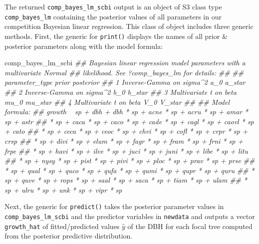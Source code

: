 \documentclass[12pt]{article}
\newenvironment{Shaded}{\begin{snugshade}}{\end{snugshade}}
\newcommand{\CommentTok}[1]{\textcolor[rgb]{0.56,0.35,0.01}{\textit{#1}}}
\newcommand{\DataTypeTok}[1]{\textcolor[rgb]{0.13,0.29,0.53}{#1}}
\newcommand{\KeywordTok}[1]{\textcolor[rgb]{0.13,0.29,0.53}{\textbf{#1}}}
\newcommand{\NormalTok}[1]{#1}
\newcommand{\OperatorTok}[1]{\textcolor[rgb]{0.81,0.36,0.00}{\textbf{#1}}}
\newcommand{\StringTok}[1]{\textcolor[rgb]{0.31,0.60,0.02}{#1}}
\begin{document}
The returned \texttt{comp\_bayes\_lm\_scbi} output is an object of S3
class type \texttt{comp\_bayes\_lm} containing the posterior values of
all parameters in our competition Bayesian linear regression. This class
of object includes three generic methods. First, the generic for
\texttt{print()} displays the names of all prior \& posterior parameters
along with the model formula:

\begin{Shaded}
\begin{Highlighting}[]
\NormalTok{comp_bayes_lm_scbi}
\CommentTok{## Bayesian linear regression model parameters with a multivariate Normal}
\CommentTok{## likelihood. See ?comp_bayes_lm for details:}
\CommentTok{## }
\CommentTok{##   parameter_type           prior posterior}
\CommentTok{## 1 Inverse-Gamma on sigma^2 a_0   a_star   }
\CommentTok{## 2 Inverse-Gamma on sigma^2 b_0   b_star   }
\CommentTok{## 3 Multivariate t on beta   mu_0  mu_star  }
\CommentTok{## 4 Multivariate t on beta   V_0   V_star   }
\CommentTok{## }
\CommentTok{## Model formula:}
\CommentTok{## growth ~ sp + dbh + dbh * sp + acne * sp + acru * sp + amar * sp + astr}
\CommentTok{## * sp + caca * sp + caco * sp + cade * sp + cagl * sp + caovl * sp + cato}
\CommentTok{## * sp + ceca * sp + ceoc * sp + chvi * sp + cofl * sp + crpr * sp + crsp}
\CommentTok{## * sp + divi * sp + elum * sp + fagr * sp + fram * sp + frni * sp + frpe}
\CommentTok{## * sp + havi * sp + ilve * sp + juci * sp + juni * sp + libe * sp + litu}
\CommentTok{## * sp + nysy * sp + pist * sp + pivi * sp + ploc * sp + prav * sp + prse}
\CommentTok{## * sp + qual * sp + quco * sp + qufa * sp + qumi * sp + qupr * sp + quru}
\CommentTok{## * sp + quve * sp + rops * sp + saal * sp + saca * sp + tiam * sp + ulam}
\CommentTok{## * sp + ulru * sp + unk * sp + vipr * sp}
\end{Highlighting}
\end{Shaded}

Next, the generic for \texttt{predict()} takes the posterior parameter
values in \texttt{comp\_bayes\_lm\_scbi} and the predictor variables in
\texttt{newdata} and outputs a vector \texttt{growth\_hat} of
fitted/predicted values \(\widehat{y}\) of the DBH for each focal tree
computed from the posterior predictive distribution.

\begin{Shaded}
\end{Shaded}
\end{document}
